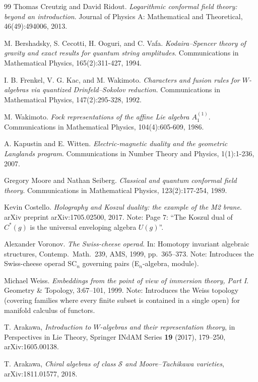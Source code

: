 \begin{thebibliography}{99}
Thomas Creutzig and David Ridout.
\textit{Logarithmic conformal field theory: beyond an introduction}.
Journal of Physics A: Mathematical and Theoretical,
46(49):494006, 2013.

M. Bershadsky, S. Cecotti, H. Ooguri, and C. Vafa.
\textit{Kodaira--Spencer theory of gravity and exact results for quantum string amplitudes}.
Communications in Mathematical Physics, 165(2):311-427, 1994.

I. B. Frenkel, V. G. Kac, and M. Wakimoto.
\textit{Characters and fusion rules for $W$-algebras via quantized Drinfeld--Sokolov reduction}.
Communications in Mathematical Physics, 147(2):295-328, 1992.

M. Wakimoto.
\textit{Fock representations of the affine Lie algebra $A_1^{(1)}$}.
Communications in Mathematical Physics, 104(4):605-609, 1986.

A. Kapustin and E. Witten.
\textit{Electric-magnetic duality and the geometric Langlands program}.
Communications in Number Theory and Physics, 1(1):1-236, 2007.

Gregory Moore and Nathan Seiberg.
\textit{Classical and quantum conformal field theory}.
Communications in Mathematical Physics, 123(2):177-254, 1989.

Kevin Costello.
\textit{Holography and Koszul duality: the example of the M2 brane}.
arXiv preprint arXiv:1705.02500, 2017.
Note: Page 7: ``The Koszul dual of $C^*(g)$ is the universal enveloping algebra $U(g)$''.

Alexander Voronov.
\textit{The Swiss-cheese operad}.
In: Homotopy invariant algebraic structures, Contemp.\ Math.\ 239, AMS, 1999, pp.~365--373.
Note: Introduces the Swiss-cheese operad SC$_n$ governing pairs (E$_n$-algebra, module).

Michael Weiss.
\textit{Embeddings from the point of view of immersion theory, Part I}.
Geometry \& Topology, 3:67--101, 1999.
Note: Introduces the Weiss topology (covering families where every finite subset is contained in a single open) for manifold calculus of functors.

 T. Arakawa, \emph{Introduction to $W$-algebras and their representation theory}, in Perspectives in Lie Theory, Springer INdAM Series \textbf{19} (2017), 179--250, arXiv:1605.00138.

 T. Arakawa, \emph{Chiral algebras of class $\mathcal{S}$ and Moore--Tachikawa varieties}, arXiv:1811.01577, 2018.


\end{thebibliography}
